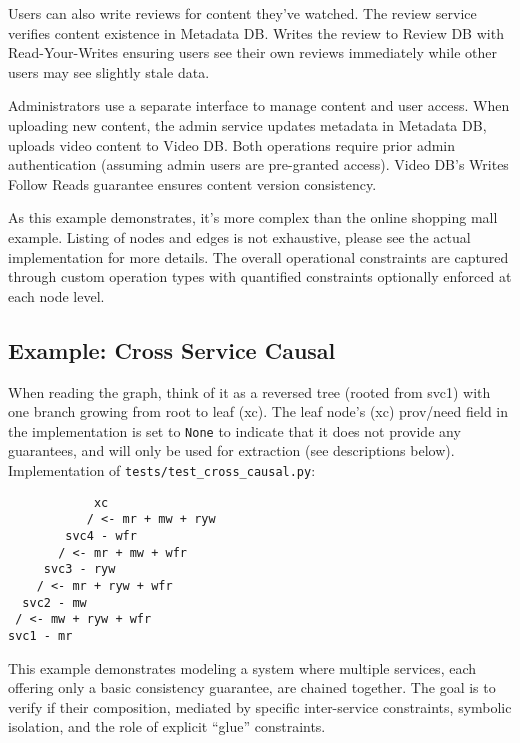 Users can also write reviews for content they've watched. The review service
verifies content existence in Metadata DB. Writes the review to Review DB with
Read-Your-Writes ensuring users see their own reviews immediately while other
users may see slightly stale data.

Administrators use a separate interface to manage content and user access. When
uploading new content, the admin service updates metadata in Metadata DB,
uploads video content to Video DB. Both operations require prior admin
authentication (assuming admin users are pre-granted access). Video DB's Writes
Follow Reads guarantee ensures content version consistency.

As this example demonstrates, it's more complex than the online shopping mall
example. Listing of nodes and edges is not exhaustive, please see the actual
implementation for more details. The overall operational constraints are
captured through custom operation types with quantified constraints optionally
enforced at each node level.


\subsection{Example: Cross Service Causal}

When reading the graph, think of it as a reversed tree (rooted from svc1) with
one branch growing from root to leaf (xc). The leaf node's (xc) prov/need field
in the implementation is set to \texttt{None} to indicate that it
does not provide any
guarantees, and will only be used for extraction (see descriptions below).
Implementation of \texttt{tests/test\_cross\_causal.py}:

\begin{verbatim}
            xc
           / <- mr + mw + ryw
        svc4 - wfr
       / <- mr + mw + wfr
     svc3 - ryw
    / <- mr + ryw + wfr
  svc2 - mw
 / <- mw + ryw + wfr
svc1 - mr
\end{verbatim}

This example demonstrates modeling a system where multiple services, each
offering only a basic consistency guarantee, are chained together. The goal is
to verify if their composition, mediated by specific inter-service constraints,
symbolic isolation, and the role of explicit ``glue'' constraints.

